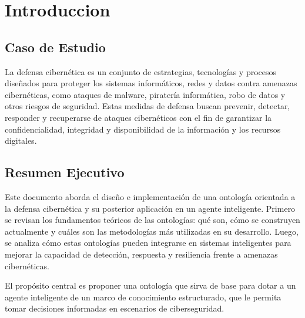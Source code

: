 \section{Introduccion}

\subsection{Caso de Estudio}
La defensa cibernética es un conjunto de estrategias, tecnologías y procesos
diseñados para proteger los sistemas informáticos, redes y datos contra
amenazas cibernéticas, como ataques de malware, piratería informática, robo de
datos y otros riesgos de seguridad. Estas medidas de defensa buscan prevenir,
detectar, responder y recuperarse de ataques cibernéticos con el fin de
garantizar la confidencialidad, integridad y disponibilidad de la información y
los recursos digitales.

\subsection{Resumen Ejecutivo}
Este documento aborda el diseño e implementación de una ontología orientada a 
la defensa cibernética y su posterior aplicación en un agente inteligente. 
Primero se revisan los fundamentos teóricos de las ontologías: qué son, cómo se 
construyen actualmente y cuáles son las metodologías más utilizadas en su 
desarrollo. Luego, se analiza cómo estas ontologías pueden integrarse en 
sistemas inteligentes para mejorar la capacidad de detección, respuesta y 
resiliencia frente a amenazas cibernéticas. 

El propósito central es proponer una ontología que sirva de base para dotar a 
un agente inteligente de un marco de conocimiento estructurado, que le permita 
tomar decisiones informadas en escenarios de ciberseguridad.